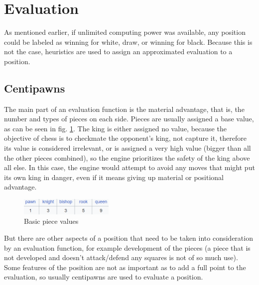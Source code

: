 
\section{Evaluation}
\label{sec:ch2sec3}

As mentioned earlier, if unlimited computing power was available, any position could be labeled as winning for white, draw, or winning for black. Because this is not the case, heuristics are used to assign an approximated evaluation to a position.

\subsection{Centipawns}
\label{subsec:ch2sec3subsec1}

The main part of an evaluation function is the material advantage, that is, the number and types of pieces on each side. Pieces are usually assigned a base value, as can be seen in fig. \ref{fig:basicPieceValues}. The king is either assigned no value, because the objective of chess is to checkmate the opponent's king, not capture it, therefore its value is considered irrelevant, or is assigned a very high value (bigger than all the other pieces combined), so the engine prioritizes the safety of the king above all else. In this case, the engine would attempt to avoid any moves that might put its own king in danger, even if it means giving up material or positional advantage.

\begin{figure}[h]
    \centering
    \includegraphics[width=0.4\textwidth]{figures/piece-basic-values.png}
    \caption{Basic piece values}
    \label{fig:basicPieceValues}
\end{figure}

But there are other aspects of a position that need to be taken into consideration by an evaluation function, for example development of the pieces (a piece that is not developed and doesn't attack/defend any squares is not of so much use). Some features of the position are not as important as to add a full point to the evaluation, so usually centipawns are used to evaluate a position. 

